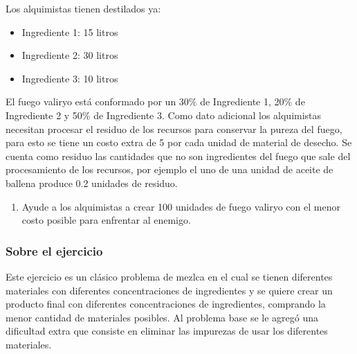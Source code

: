 \documentclass[a4paper,10pt,twocolumn]{article}
\theoremstyle{theorem}
\theoremstyle{definition}
\theoremstyle{remark}
\begin{document}
Los alquimistas tienen destilados ya:

\begin{itemize}

	\item Ingrediente 1: 15 litros
	\item Ingrediente 2: 30 litros
	\item Ingrediente 3: 10 litros

\end{itemize}

El fuego valiryo está conformado por un 30\% de Ingrediente 1, 20\% de Ingrediente 2 y 50\% de Ingrediente 3. Como dato adicional los alquimistas necesitan procesar el residuo de los recursos para conservar la pureza del fuego, para esto se tiene un costo extra de 5 por cada unidad de material de desecho. Se cuenta como residuo las cantidades que no son ingredientes del fuego que sale del procesamiento de los recursos, por ejemplo el uno de una unidad de aceite de ballena produce 0.2 unidades de residuo.

\renewcommand{\theenumi}{\alph{enumi}} %

\begin{enumerate}

	\item Ayude a los alquimistas a crear 100 unidades de fuego valiryo con el menor costo posible para enfrentar al enemigo.

\end{enumerate}

		\subsubsection{Sobre el ejercicio}\label{subsubsec:sobre_ejer_3}

Este ejercicio es un clásico problema de mezlca en el cual se tienen diferentes materiales con diferentes concentraciones de ingredientes y se quiere crear un producto final con diferentes concentraciones de ingredientes, comprando la menor cantidad de materiales posibles. Al problema base se le agregó una dificultad extra que consiste en eliminar las impurezas de usar los diferentes materiales.

\end{document}
